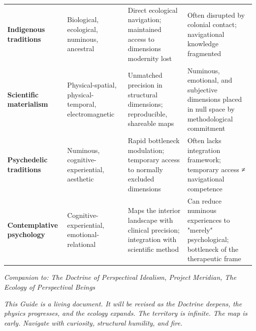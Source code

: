 \begin{longtable}{p{} p{} p{} p{}}
\textbf{Indigenous traditions} & Biological, ecological, numinous, ancestral & Direct ecological navigation; maintained access to dimensions modernity lost & Often disrupted by colonial contact; navigational knowledge fragmented \\
\textbf{Scientific materialism} & Physical-spatial, physical-temporal, electromagnetic & Unmatched precision in structural dimensions; reproducible, shareable maps & Numinous, emotional, and subjective dimensions placed in null space by methodological commitment \\
\textbf{Psychedelic traditions} & Numinous, cognitive-experiential, aesthetic & Rapid bottleneck modulation; temporary access to normally excluded dimensions & Often lacks integration framework; temporary access ≠ navigational competence \\
\textbf{Contemplative psychology} & Cognitive-experiential, emotional-relational & Maps the interior landscape with clinical precision; integration with scientific method & Can reduce numinous experiences to "merely" psychological; bottleneck of the therapeutic frame \\
\bottomrule
\end{longtable}



\bigskip\noindent\makebox[\textwidth]{\color{rulegray}\rule{5cm}{0.3pt}}\bigskip


\textit{Companion to: The Doctrine of Perspectival Idealism, Project Meridian, The Ecology of Perspectival Beings}


\textit{This Guide is a living document. It will be revised as the Doctrine deepens, the physics progresses, and the ecology expands. The territory is infinite. The map is early. Navigate with curiosity, structural humility, and fire.}


